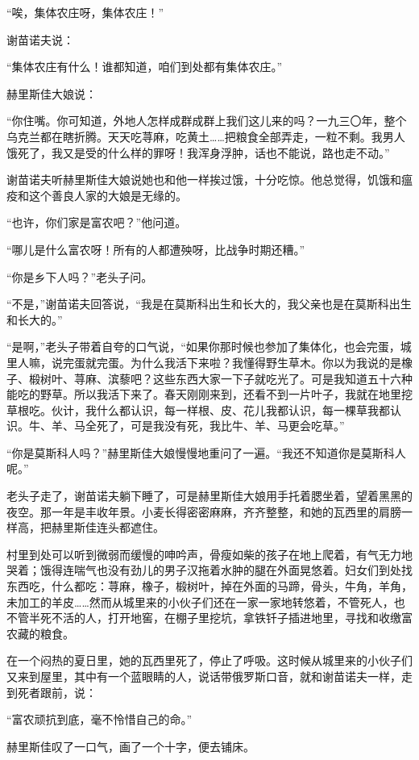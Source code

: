 “唉，集体农庄呀，集体农庄！”

谢苗诺夫说：

“集体农庄有什么！谁都知道，咱们到处都有集体农庄。”

赫里斯佳大娘说：

“你住嘴。你可知道，外地人怎样成群成群上我们这儿来的吗？一九三〇年，整个乌克兰都在瞎折腾。天天吃荨麻，吃黄土……把粮食全部弄走，一粒不剩。我男人饿死了，我又是受的什么样的罪呀！我浑身浮肿，话也不能说，路也走不动。”

谢苗诺夫听赫里斯佳大娘说她也和他一样挨过饿，十分吃惊。他总觉得，饥饿和瘟疫和这个善良人家的大娘是无缘的。

“也许，你们家是富农吧？”他问道。

“哪儿是什么富农呀！所有的人都遭殃呀，比战争时期还糟。”

“你是乡下人吗？”老头子问。

“不是，”谢苗诺夫回答说，“我是在莫斯科出生和长大的，我父亲也是在莫斯科出生和长大的。”

“是啊，”老头子带着自夸的口气说，“如果你那时候也参加了集体化，也会完蛋，城里人嘛，说完蛋就完蛋。为什么我活下来啦？我懂得野生草木。你以为我说的是橡子、椴树叶、荨麻、滨藜吧？这些东西大家一下子就吃光了。可是我知道五十六种能吃的野草。所以我活下来了。春天刚刚来到，还看不到一片叶子，我就在地里挖草根吃。伙计，我什么都认识，每一样根、皮、花儿我都认识，每一棵草我都认识。牛、羊、马全死了，可是我没有死，我比牛、羊、马更会吃草。”

“你是莫斯科人吗？”赫里斯佳大娘慢慢地重问了一遍。“我还不知道你是莫斯科人呢。”

老头子走了，谢苗诺夫躺下睡了，可是赫里斯佳大娘用手托着腮坐着，望着黑黑的夜空。那一年是丰收年景。小麦长得密密麻麻，齐齐整整，和她的瓦西里的肩膀一样高，把赫里斯佳连头都遮住。

村里到处可以听到微弱而缓慢的呻吟声，骨瘦如柴的孩子在地上爬着，有气无力地哭着；饿得连喘气也没有劲儿的男子汉拖着水肿的腿在外面晃悠着。妇女们到处找东西吃，什么都吃：荨麻，橡子，椴树叶，掉在外面的马蹄，骨头，牛角，羊角，未加工的羊皮……然而从城里来的小伙子们还在一家一家地转悠着，不管死人，也不管半死不活的人，打开地窖，在棚子里挖坑，拿铁钎子插进地里，寻找和收缴富农藏的粮食。

在一个闷热的夏日里，她的瓦西里死了，停止了呼吸。这时候从城里来的小伙子们又来到屋里，其中有一个蓝眼睛的人，说话带俄罗斯口音，就和谢苗诺夫一样，走到死者跟前，说：

“富农顽抗到底，毫不怜惜自己的命。”

赫里斯佳叹了一口气，画了一个十字，便去铺床。

